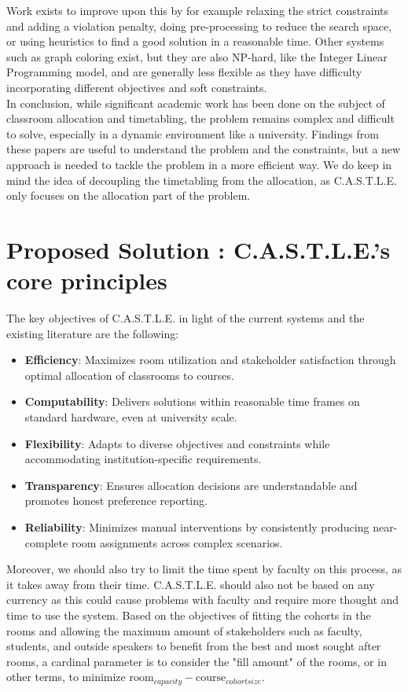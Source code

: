 \documentclass[a4paper, oneside]{article}
\newcommand{\castle}{C{\small.}A{\small.}S{\small.}T{\small.}L{\small.}E{\small.}}
\begin{document}
Work exists to improve upon this by for example relaxing the strict constraints and adding a violation penalty, doing pre-processing to reduce the search space, or using heuristics to find a good solution in a reasonable time.
Other systems such as graph coloring exist, but they are also NP-hard, like the Integer Linear Programming model, and are generally less flexible as they have difficulty incorporating different objectives and soft constraints.\\

In conclusion, while significant academic work has been done on the subject of classroom allocation and timetabling, the problem remains complex and difficult to solve, especially in a dynamic environment like a university. Findings
from these papers are useful to understand the problem and the constraints, but a new approach is needed to tackle the problem in a more efficient way. We do keep in mind the idea of decoupling the
timetabling from the allocation, as \castle{} only focuses on the allocation part of the problem.

\section{Proposed Solution : \castle{}'s core principles}

The key objectives of \castle{} in light of the current systems and the existing literature are the following:
\begin{itemize}
	\item \textbf{Efficiency}: Maximizes room utilization and stakeholder satisfaction through optimal allocation of classrooms to courses.
	\item \textbf{Computability}: Delivers solutions within reasonable time frames on standard hardware, even at university scale.
	\item \textbf{Flexibility}: Adapts to diverse objectives and constraints while accommodating institution-specific requirements.
	\item \textbf{Transparency}: Ensures allocation decisions are understandable and promotes honest preference reporting.
	\item \textbf{Reliability}: Minimizes manual interventions by consistently producing near-complete room assignments across complex scenarios.
\end{itemize}

Moreover, we should also try to limit the time spent by faculty on this process, as it takes away from their time. \castle{} should also 
not be based on any currency as this could cause problems with faculty and require more thought and time to use the system.
Based on the objectives of fitting the cohorts in the rooms and allowing the maximum amount of stakeholders such as faculty, students, and outside speakers
to benefit from the best and most sought after rooms, a cardinal parameter is to consider the "fill amount" of the rooms, or in other terms, to minimize
$\text{room}_{capacity} - \text{course}_{cohort size}$.
\end{document}
